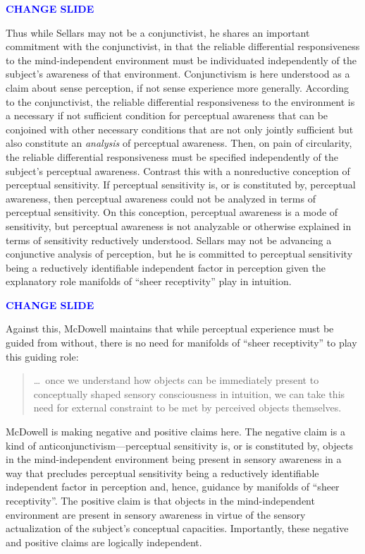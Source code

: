 \documentclass[12pt]{article}
\newcommand{\change}{\textcolor{blue}{\textbf{CHANGE SLIDE}}}
\begin{document}
\change

Thus while Sellars may not be a conjunctivist, he shares an important commitment with the conjunctivist, in that the reliable differential responsiveness to the mind-independent environment must be individuated independently of the subject's awareness of that environment. Conjunctivism is here understood as a claim about sense perception, if not sense experience more generally. According to the conjunctivist, the reliable differential responsiveness to the environment is a necessary if not sufficient condition for perceptual awareness that can be conjoined with other necessary conditions that are not only jointly sufficient but also constitute an \emph{analysis} of perceptual awareness. Then, on pain of circularity, the reliable differential responsiveness must be specified independently of the subject's perceptual awareness. Contrast this with a nonreductive conception of perceptual sensitivity. If perceptual sensitivity is, or is constituted by, perceptual awareness, then perceptual awareness could not be analyzed in terms of perceptual sensitivity. On this conception, perceptual awareness is a mode of sensitivity, but perceptual awareness is not analyzable or otherwise explained in terms of sensitivity reductively understood. Sellars may not be advancing a conjunctive analysis of perception, but he is committed to perceptual sensitivity being a reductively identifiable independent factor in perception given the explanatory role manifolds of ``sheer receptivity'' play in intuition.

\change

Against this, McDowell maintains that while perceptual experience must be guided from without, there is no need for manifolds of ``sheer receptivity'' to play this guiding role:
\begin{quote}
    \ldots\ once we understand how objects can be immediately present to conceptually shaped sensory consciousness in intuition, we can take this need for external constraint to be met by perceived objects themselves.
\end{quote}
McDowell is making negative and positive claims here. The negative claim is a kind of anticonjunctivism---perceptual sensitivity is, or is constituted by, objects in the mind-independent environment being present in sensory awareness in a way that precludes perceptual sensitivity being a reductively identifiable independent factor in perception and, hence, guidance by manifolds of ``sheer receptivity''. The positive claim is that objects in the mind-independent environment are present in sensory awareness in virtue of the sensory actualization of the subject's conceptual capacities. Importantly, these negative and positive claims are logically independent.
\end{document}
